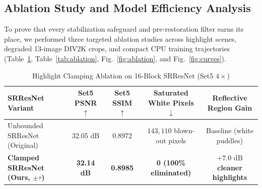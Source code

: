 \documentclass[10pt,onecolumn,journal]{IEEEtran}
\begin{document}
\subsection{Ablation Study and Model Efficiency Analysis}
To prove that every stabilization safeguard and pre-restoration filter earns its place, we performed three targeted ablation studies across highlight scenes, degraded 13-image DIV2K crops, and compact CPU training trajectories (Table~\ref{tab:clamp}, Table~\ref{tab:ablation}, Fig.~\ref{fig:ablation}, and Fig.~\ref{fig:curves}).

\begin{table}[t]
\centering
\caption{Highlight Clamping Ablation on 16-Block SRResNet (Set5 $4\times$)}
\label{tab:clamp}
\footnotesize
\begin{tabular}{@{}lcccc@{}}
\toprule
\textbf{SRResNet Variant} & \textbf{Set5 PSNR $\uparrow$} & \textbf{Set5 SSIM $\uparrow$} & \textbf{Saturated White Pixels $\downarrow$} & \textbf{Reflective Region Gain} \\
\midrule
Unbounded SRResNet (Original) & 32.05 dB & 0.8972 & $143{,}110$ blown-out pixels & Baseline (white puddles) \\
\textbf{Clamped SRResNet (Ours, $\pm\tau$)} & \textbf{32.14 dB} & \textbf{0.8985} & \textbf{0 (100\% eliminated)} & \textbf{$+7.0\text{ dB}$ cleaner highlights} \\
\bottomrule
\end{tabular}
\end{table}
\end{document}
